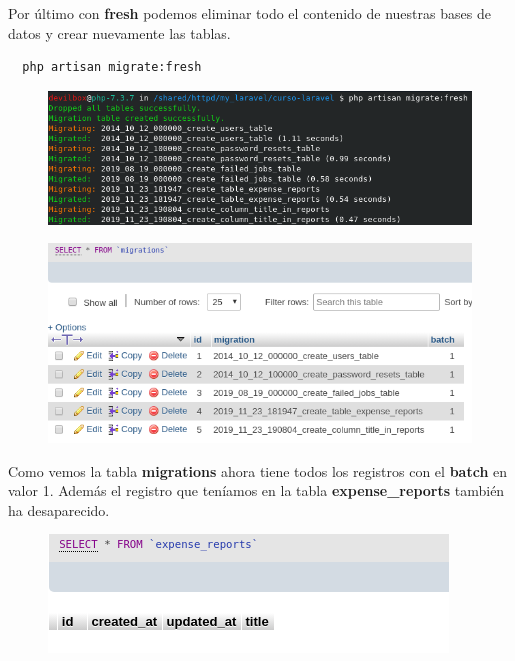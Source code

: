 \documentclass{article}
\begin{document}
Por último con \textbf{fresh} podemos eliminar todo el contenido de nuestras
bases de datos y crear nuevamente las tablas.

\begin{verbatim}
  php artisan migrate:fresh
\end{verbatim}

\begin{figure}[h!]
  \centering
  \includegraphics[scale=0.75]{./Pictures/044_migrate_fresh.png}
\end{figure}

\begin{figure}[h!]
  \centering
  \includegraphics[scale=0.75]{./Pictures/045_migration_fresh.png}
\end{figure}

Como vemos la tabla \textbf{migrations} ahora tiene todos los registros con el
\textbf{batch} en valor 1. Además el registro que teníamos en la tabla
\textbf{expense\_reports} también ha desaparecido.\\

\begin{figure}[h!]
  \centering
  \includegraphics[scale=0.75]{./Pictures/046_expense_report_dropped.png}
\end{figure}
\end{document}
